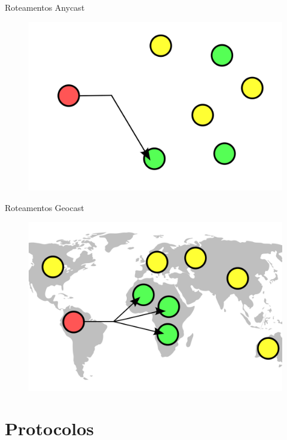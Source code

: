 \documentclass[t]{beamer}
\begin{document}
\begin{frame}{Roteamentos}
Anycast
\begin{figure}
	\includegraphics[width=\linewidth]{Anycast-BM}
\end{figure}
\end{frame}


\begin{frame}{Roteamentos}
Geocast
\begin{figure}
	\includegraphics[width=\linewidth]{Geocast}
\end{figure}
\end{frame}

\section{Protocolos}
\end{document}
